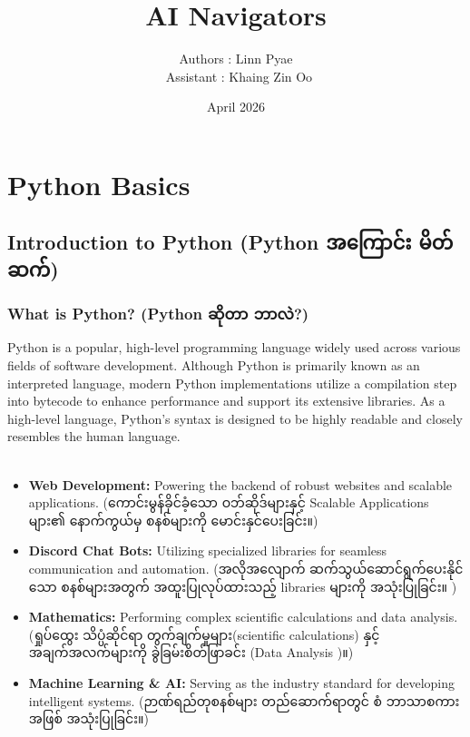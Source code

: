 \documentclass{report}
\title{AI Navigators}
\author{Authors : Linn Pyae \\\ Assistant : Khaing Zin Oo}
\date{April 2026}
\begin{document}
\maketitle

\chapter{Python Basics}
\section{Introduction to Python (\burmesefont Python အကြောင်း မိတ်ဆက်)}
\subsection{What is Python? (\burmesefont Python ဆိုတာ ဘာလဲ?)}

Python is a popular, high-level programming language widely used across various fields of software development. Although Python is primarily known as an interpreted language, modern Python implementations utilize a compilation step into bytecode to enhance performance and support its extensive libraries. As a high-level language, Python's syntax is designed to be highly readable and closely resembles the human language. \\\\
\begin{itemize}
    \item \textbf{Web Development:} Powering the backend of robust websites and scalable applications. ({\burmesefont ကောင်းမွန်ခိုင်ခံ့သော ဝဘ်ဆိုဒ်များနှင့် Scalable Applications များ၏ နောက်ကွယ်မှ စနစ်များကို မောင်းနှင်ပေးခြင်း။})
    \item \textbf{Discord Chat Bots:} Utilizing specialized libraries for seamless communication and automation. ({\burmesefont အလိုအလျောက် ဆက်သွယ်ဆောင်ရွက်ပေးနိုင်သော စနစ်များအတွက် အထူးပြုလုပ်ထားသည့် libraries များကို အသုံးပြုခြင်း။
})
    \item \textbf{Mathematics:} Performing complex scientific calculations and data analysis. ({\burmesefont ရှုပ်ထွေး သိပ္ပံဆိုင်ရာ တွက်ချက်မှုများ(scientific calculations) နှင့် အချက်အလက်များကို ခွဲခြမ်းစိတ်ဖြာခင်း (Data Analysis )။})
    \item \textbf{Machine Learning \& AI:} Serving as the industry standard for developing intelligent systems. ({\burmesefont ဉာဏ်ရည်တုစနစ်များ တည်ဆောက်ရာတွင် စံ ဘာသာစကားအဖြစ် အသုံးပြုခြင်း။})
\end{itemize}
\end{document}
